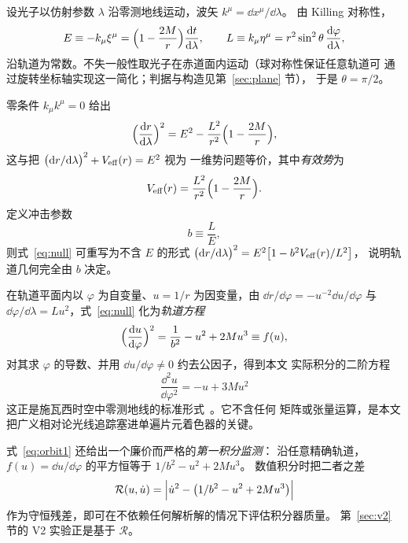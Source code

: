 设光子以仿射参数 $\lambda$ 沿零测地线运动，波矢 $k^{\mu}=\dd x^{\mu}/\dd\lambda$。
由 Killing 对称性，
\begin{equation}
E\equiv-k_{\mu}\xi^{\mu}=\Bigl(1-\frac{2M}{r}\Bigr)\frac{\mathrm{d} t}{\mathrm{d}\lambda},
\qquad
L\equiv k_{\mu}\eta^{\mu}=r^{2}\sin^{2}\theta\,\frac{\mathrm{d}\varphi}{\mathrm{d}\lambda},
\label{eq:EL}
\end{equation}
沿轨道为常数。不失一般性取光子在赤道面内运动（球对称性保证任意轨道可
通过旋转坐标轴实现这一简化；判据与构造见第~\ref{sec:plane} 节），
于是 $\theta=\pi/2$。

零条件 $k_{\mu}k^{\mu}=0$ 给出
\begin{equation}
\Bigl(\frac{\mathrm{d} r}{\mathrm{d}\lambda}\Bigr)^{2}
=E^{2}-\frac{L^{2}}{r^{2}}\Bigl(1-\frac{2M}{r}\Bigr),
\label{eq:null}
\end{equation}
这与把 $\bigl(\mathrm{d} r/\mathrm{d}\lambda\bigr)^{2}+V_{\rm eff}(r)=E^{2}$ 视为
一维势问题等价，其中\emph{有效势}为
\begin{equation}
V_{\rm eff}(r)=\frac{L^{2}}{r^{2}}\Bigl(1-\frac{2M}{r}\Bigr).
\label{eq:Veff}
\end{equation}
定义冲击参数
\begin{equation}
b\equiv\frac{L}{E},
\label{eq:impact}
\end{equation}
则式~\eqref{eq:null} 可重写为不含 $E$ 的形式
$\bigl(\mathrm{d} r/\mathrm{d}\lambda\bigr)^{2}=E^{2}\bigl[1-b^{2}V_{\rm eff}(r)/L^{2}\bigr]$，
说明轨道几何完全由 $b$ 决定。

在轨道平面内以 $\varphi$ 为自变量、$u=1/r$ 为因变量，由
$\dd r/\dd\varphi=-u^{-2}\dd u/\dd\varphi$ 与
$\dd\varphi/\dd\lambda=L u^{2}$，式~\eqref{eq:null} 化为\emph{轨道方程}
\begin{equation}
\Bigl(\frac{\mathrm{d} u}{\mathrm{d}\varphi}\Bigr)^{2}
=\frac{1}{b^{2}}-u^{2}+2Mu^{3}
\equiv f(u),
\label{eq:orbit1}
\end{equation}
对其求 $\varphi$ 的导数、并用 $\dd u/\dd\varphi\neq0$ 约去公因子，得到本文
实际积分的二阶方程
\begin{equation}
\boxed{\;\frac{\dd^{2}u}{\dd\varphi^{2}}=-u+3Mu^{2}\;}
\label{eq:geodesic}
\end{equation}
这正是施瓦西时空中零测地线的标准形式~\cite{chandrasekhar1983}。它不含任何
矩阵或张量运算，是本文把广义相对论光线追踪塞进单遍片元着色器的关键。

式~\eqref{eq:orbit1} 还给出一个廉价而严格的\emph{第一积分监测}：
沿任意精确轨道，$f(u)=\dd u/\dd\varphi$ 的平方恒等于 $1/b^{2}-u^{2}+2Mu^{3}$。
数值积分时把二者之差
\begin{equation}
\mathcal{R}(u,\dot u)=\Bigl|\dot u^{2}-\bigl(1/b^{2}-u^{2}+2Mu^{3}\bigr)\Bigr|
\label{eq:residual}
\end{equation}
作为守恒残差，即可在不依赖任何解析解的情况下评估积分器质量。
第~\ref{sec:v2} 节的 V2 实验正是基于 $\mathcal{R}$。

